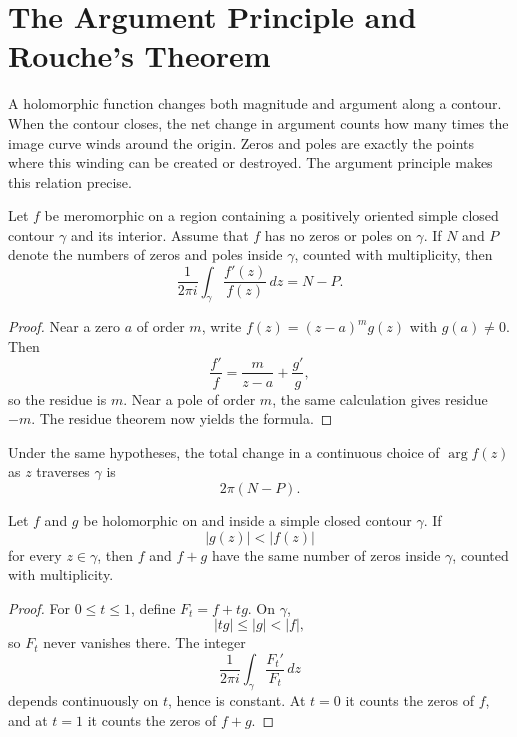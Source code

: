 \section{The Argument Principle and Rouche's Theorem}

A holomorphic function changes both magnitude and argument along a contour. When the contour closes, the net change in argument counts how many times the image curve winds around the origin. Zeros and poles are exactly the points where this winding can be created or destroyed. The argument principle makes this relation precise.

\begin{theorem}
Let $f$ be meromorphic on a region containing a positively oriented simple closed contour $\gamma$ and its interior. Assume that $f$ has no zeros or poles on $\gamma$. If $N$ and $P$ denote the numbers of zeros and poles inside $\gamma$, counted with multiplicity, then
\[
    \frac{1}{2\pi i}\int_\gamma\frac{f'(z)}{f(z)}\,dz=N-P.
\]
\end{theorem}

\begin{proof}
Near a zero $a$ of order $m$, write $f(z)=(z-a)^m g(z)$ with $g(a)\neq0$. Then
\[
    \frac{f'}{f}=\frac{m}{z-a}+\frac{g'}{g},
\]
so the residue is $m$. Near a pole of order $m$, the same calculation gives residue $-m$. The residue theorem now yields the formula.
\end{proof}

\begin{corollary}
Under the same hypotheses, the total change in a continuous choice of $\arg f(z)$ as $z$ traverses $\gamma$ is
\[
    2\pi(N-P).
\]
\end{corollary}

\begin{theorem}
Let $f$ and $g$ be holomorphic on and inside a simple closed contour $\gamma$. If
\[
    |g(z)|<|f(z)|
\]
for every $z\in\gamma$, then $f$ and $f+g$ have the same number of zeros inside $\gamma$, counted with multiplicity.
\end{theorem}

\begin{proof}
For $0\leq t\leq1$, define $F_t=f+tg$. On $\gamma$,
\[
    |tg|\leq|g|<|f|,
\]
so $F_t$ never vanishes there. The integer
\[
    \frac{1}{2\pi i}\int_\gamma\frac{F_t'}{F_t}\,dz
\]
depends continuously on $t$, hence is constant. At $t=0$ it counts the zeros of $f$, and at $t=1$ it counts the zeros of $f+g$.
\end{proof}

